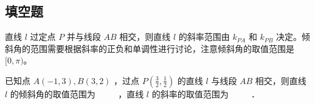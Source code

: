 \vspace{4em}

\subsection{填空题}
\begin{theorem}[斜率的几何意义]
    直线 $l$ 过定点 $P$ 并与线段 $AB$ 相交，则直线 $l$ 的斜率范围由 $k_{PA}$ 和 $k_{PB}$ 决定。倾斜角的范围需要根据斜率的正负和单调性进行讨论，注意倾斜角的取值范围是 $[0, \pi)$。
\end{theorem}
\begin{example}
    已知点 $A(-1,3), B(3,2)$ ，过点 $P\left(\frac{3}{2}, \frac{1}{2}\right)$ 的直线 $l$ 与线段 $A B$ 相交，则直线 $l$ 的倾斜角的取值范围为 $\qquad$ ，直线 $l$ 的斜率的取值范围为 $\qquad$ ．
\end{example}

\vspace{4em}


